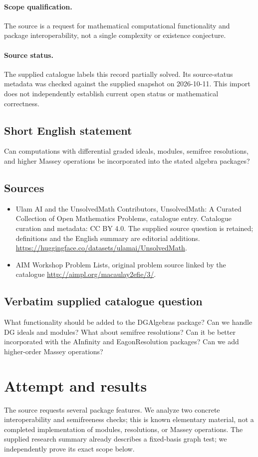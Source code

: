 \documentclass[11pt]{article}
\begin{document}
\paragraph{Scope qualification.}
The source is a request for mathematical computational functionality and package interoperability, not a single complexity or existence conjecture.
\paragraph{Source status.}
The supplied catalogue labels this record partially solved. Its source-status metadata was checked against the supplied snapshot on 2026-10-11. This import does not independently establish current open status or mathematical correctness.
\subsection{Short English statement}
Can computations with differential graded ideals, modules, semifree resolutions, and higher Massey operations be incorporated into the stated algebra packages?
\subsection{Sources}
\begin{itemize}
\item[S1] Ulam AI and the UnsolvedMath Contributors, UnsolvedMath: A Curated Collection of Open Mathematics Problems, catalogue entry. Catalogue curation and metadata: CC BY 4.0. The supplied source question is retained; definitions and the English summary are editorial additions.
\url{https://huggingface.co/datasets/ulamai/UnsolvedMath}.
\item[S2] AIM Workshop Problem Lists, original problem source linked by the catalogue
\url{http://aimpl.org/macaulay2efie/3/}.
\end{itemize}
\subsection{Verbatim supplied catalogue question}
What functionality should be added to the DGAlgebras package? Can we handle DG ideals and modules? What about semifree resolutions? Can it be better incorporated with the AInfinity and EagonResolution packages? Can we add higher-order Massey operations?

\section{Attempt and results}
The source requests several package features. We analyze two concrete
interoperability and semifreeness checks; this is known elementary material,
not a completed implementation of modules, resolutions, or Massey operations.
The supplied research summary already describes a fixed-basis graph test;
we independently prove its exact scope below.
\end{document}
